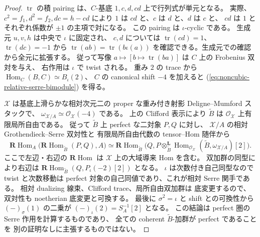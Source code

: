 \begin{proof}
$\operatorname{tr}$ の積 pairing は、$C$-基底
$1,c,d,cd$ 上で行列式が単元となる。
実際、$c^2=f_1,d^2=f_2,dc=h-cd$ により
$1$ は $cd$ と、$c$ は $d$ と、$d$ は $c$ と、
$cd$ は $1$ とそれぞれ係数が $\pm1$ の主項で対になる。
この pairing は $\iota$-cyclic である。
生成元 $u,v,h$ は中央で $\iota$ に固定され、
$c,d$ については
$\operatorname{tr}(cd)=1$、
$\operatorname{tr}(dc)=-1$ から
$\operatorname{tr}(ab)=\operatorname{tr}(b\iota(a))$
を確認できる。生成元での確認から全元に拡張する。
従って写像 $a\mapsto[b\mapsto\operatorname{tr}(ba)]$ は
$C$ 上の Frobenius 双対を与え、
右作用は $\iota$ で twist される。
重み $2$ の trace から
$\operatorname{Hom}_C(B,C)\simeq B_\iota(2)$、
$C$ の canonical shift $-4$ を加えると
(\ref{eq:noncubic-relative-serre-bimodule}) を得る。

$\mathcal X$ は基底上滑らかな相対次元二の
proper な重み付き射影 Deligne--Mumford スタックで、
$\omega_{\mathcal X/A}\simeq\mathcal O_{\mathcal X}(-4)$ である。
上の Clifford 表示により $\widetilde B$ は
$\mathcal O_{\mathcal X}$ 上有限局所自由である。
従って $\widetilde B$ 上 perfect な二対象 $P,Q$ に対し、
$\mathcal X/A$ の相対 Grothendieck--Serre 双対性と
有限局所自由代数の tensor--Hom 随伴から
\[
 \mathbf R\operatorname{Hom}_A
 \bigl(\mathbf R\operatorname{Hom}_{\widetilde B}(P,Q),A\bigr)
 \simeq
 \mathbf R\operatorname{Hom}_{\widetilde B}
 \bigl(Q,P\otimes_{\widetilde B}^{\mathbf L}
       \operatorname{Hom}_{\mathcal O_{\mathcal X}}
         (\widetilde B,\omega_{\mathcal X/A})[2]\bigr).
\]
ここで左辺・右辺の $\mathbf R\operatorname{Hom}$ は
$\mathcal X$ 上の大域導来 Hom を含む。
双加群の同型により右辺は
$\mathbf R\operatorname{Hom}_{\widetilde B}
 (Q,P_\iota(-2)[2])$ となる。
$\iota$ は次数付き自己同型なので twist と次数移動は
perfect 対象の自己同値であり、これが相対 Serre 関手である。
相対 dualizing 線束、Clifford trace、局所自由双加群は
底変更するので、双対性も noetherian 底変更と可換する。
最後に $\sigma^2=\iota$ と shift との可換性から
$(-)_\sigma(1)$ の二乗が
$(-)_\iota(2)=S_A^{-1}[2]$ となる。
この結論は perfect 圏の Serre 作用を計算するものであり、
全ての coherent $\widetilde B$-加群が perfect であることを
別の証明なしに主張するものではない。
\end{proof}


